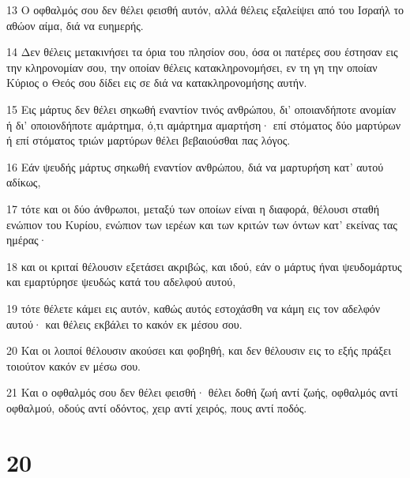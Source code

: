 \par 13 Ο οφθαλμός σου δεν θέλει φεισθή αυτόν, αλλά θέλεις εξαλείψει από του Ισραήλ το αθώον αίμα, διά να ευημερής.
\par 14 Δεν θέλεις μετακινήσει τα όρια του πλησίον σου, όσα οι πατέρες σου έστησαν εις την κληρονομίαν σου, την οποίαν θέλεις κατακληρονομήσει, εν τη γη την οποίαν Κύριος ο Θεός σου δίδει εις σε διά να κατακληρονομήσης αυτήν.
\par 15 Εις μάρτυς δεν θέλει σηκωθή εναντίον τινός ανθρώπου, δι' οποιανδήποτε ανομίαν ή δι' οποιονδήποτε αμάρτημα, ό,τι αμάρτημα αμαρτήση· επί στόματος δύο μαρτύρων ή επί στόματος τριών μαρτύρων θέλει βεβαιούσθαι πας λόγος.
\par 16 Εάν ψευδής μάρτυς σηκωθή εναντίον ανθρώπου, διά να μαρτυρήση κατ' αυτού αδίκως,
\par 17 τότε και οι δύο άνθρωποι, μεταξύ των οποίων είναι η διαφορά, θέλουσι σταθή ενώπιον του Κυρίου, ενώπιον των ιερέων και των κριτών των όντων κατ' εκείνας τας ημέρας·
\par 18 και οι κριταί θέλουσιν εξετάσει ακριβώς, και ιδού, εάν ο μάρτυς ήναι ψευδομάρτυς και εμαρτύρησε ψευδώς κατά του αδελφού αυτού,
\par 19 τότε θέλετε κάμει εις αυτόν, καθώς αυτός εστοχάσθη να κάμη εις τον αδελφόν αυτού· και θέλεις εκβάλει το κακόν εκ μέσου σου.
\par 20 Και οι λοιποί θέλουσιν ακούσει και φοβηθή, και δεν θέλουσιν εις το εξής πράξει τοιούτον κακόν εν μέσω σου.
\par 21 Και ο οφθαλμός σου δεν θέλει φεισθή· θέλει δοθή ζωή αντί ζωής, οφθαλμός αντί οφθαλμού, οδούς αντί οδόντος, χειρ αντί χειρός, πους αντί ποδός.

\chapter{20}

